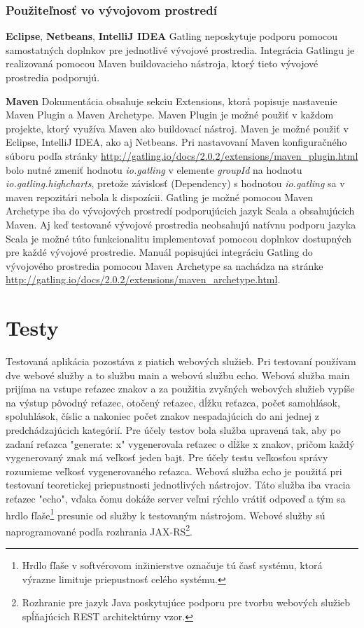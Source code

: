 \documentclass[12pt,oneside,final]{fithesis-utf8}
\begin{document}
\subsection{Použiteľnosť vo vývojovom prostredí}
\textbf{Eclipse}, \textbf{Netbeans}, \textbf{IntelliJ IDEA}
\newline
Gatling neposkytuje podporu pomocou samostatných doplnkov pre jednotlivé vývojové prostredia. Integrácia Gatlingu je realizovaná pomocou Maven buildovacieho nástroja, ktorý tieto vývojové prostredia podporujú.

\newpage
\noindent \textbf{Maven}
\newline
Dokumentácia obsahuje sekciu Extensions, ktorá popisuje nastavenie Maven Plugin a Maven Archetype.
\newline Maven Plugin je možné použiť v každom projekte, ktorý využíva Maven ako buildovací nástroj. Maven je možné použiť v Eclipse, IntelliJ IDEA, ako aj Netbeans. Pri nastavovaní Maven konfiguračného súboru podľa stránky \url{http://gatling.io/docs/2.0.2/extensions/maven_plugin.html} bolo nutné zmeniť hodnotu \textit{io.gatling} v elemente \textit{groupId} na hodnotu \textit{io.gatling.highcharts}, pretože závislosť (Dependency) s hodnotou \textit{io.gatling} sa v maven repozitári nebola k dispozícii.
\newline
\newline
Gatling je možné pomocou Maven Archetype iba do vývojových prostredí podporujúcich jazyk Scala a obsahujúcich Maven. Aj keď testované vývojové prostredia neobsahujú natívnu podporu jazyka Scala je možné túto funkcionalitu implementovať pomocou doplnkov dostupných pre každé vývojové prostredie. Manuál popisujúci integráciu Gatling do vývojového prostredia pomocou Maven Archetype sa nachádza na stránke \url{http://gatling.io/docs/2.0.2/extensions/maven_archetype.html}.
\newline


\chapter{Testy}
Testovaná aplikácia pozostáva z piatich webových služieb. Pri testovaní používam dve webové služby a to službu main a webovú službu echo. Webová služba main prijíma na vstupe reťazec znakov a za použitia zvyšných webových služieb vypíše na výstup pôvodný reťazec, otočený reťazec, dĺžku reťazca, počet samohlások, spoluhlások, číslic a nakoniec počet znakov nespadajúcich do ani jednej z predchádzajúcich kategórií. Pre účely testov bola služba upravená tak, aby po zadaní reťazca "{}generate: x" vygenerovala reťazec o dĺžke x znakov, pričom každý vygenerovaný znak má veľkosť jeden bajt. Pre účely testu veľkosťou správy rozumieme veľkosť vygenerovaného reťazca. Webová služba echo je použitá pri testovaní teoretickej priepustnosti jednotlivých nástrojov. Táto služba iba vracia reťazec "{}echo", vďaka čomu dokáže server veľmi rýchlo vrátiť odpoveď a tým sa hrdlo fľaše\footnote{Hrdlo fľaše v softvérovom inžinierstve označuje tú časť systému, ktorá výrazne limituje priepustnosť celého systému.} presunie od služby k testovaným nástrojom. Webové služby sú naprogramované podľa rozhrania JAX-RS\footnote{Rozhranie pre jazyk Java poskytujúce podporu pre tvorbu webových služieb spĺňajúcich REST architektúrny vzor.}.
\end{document}

